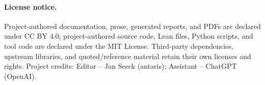 \paragraph{License notice.} Project-authored documentation, prose, generated reports, and PDFs are declared under CC BY 4.0; project-authored source code, Lean files, Python scripts, and tool code are declared under the MIT License. Third-party dependencies, upstream libraries, and quoted/reference material retain their own licenses and rights. Project credits: Editor -- Jan Seeck (antaris); Assistant -- ChatGPT (OpenAI).

